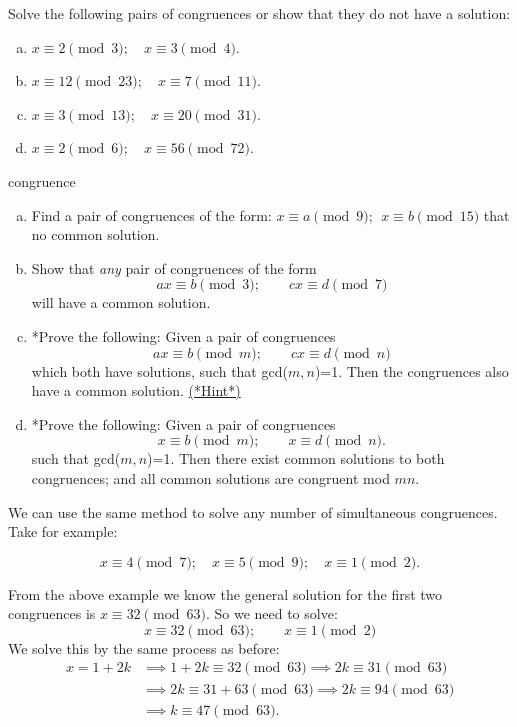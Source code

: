 \begin{exercise}{}
Solve the following pairs of congruences or show that they do not have a solution:
\begin {enumerate}[(a)]
\item
$x \equiv 2 \pmod{3}; \quad x \equiv 3 \pmod{4}.$
\item
$x \equiv 12 \pmod{23}; \quad x \equiv 7 \pmod{11}.$
\item
$x \equiv 3 \pmod{13}; \quad x \equiv 20 \pmod{31}.$
\item
$x \equiv 2 \pmod{6}; \quad  x \equiv 56 \pmod{72}.$
\end {enumerate}
\end {exercise}

\begin {exercise}{congruence}
\begin{enumerate}[(a)]
\item
Find a pair of congruences of the form: $x \equiv a \pmod{9};~~x \equiv b \pmod{15}$ that no common solution.
\item
Show that \emph{any} pair of congruences of the form 
\[ ax \equiv b \pmod{3}; \qquad cx \equiv d \pmod{7} \]
 will have a common solution.
\item
*Prove the following: Given a pair of congruences
\[ ax \equiv b \pmod{m}; \qquad cx \equiv d \pmod{n} \]
 which both have solutions, such that gcd($m,n$)=1. Then the congruences also have a common solution.
 \hyperref[sec:modular_arithmetic:hints]{(*Hint*)}
\item
*Prove the following: Given a pair of congruences
\[ x \equiv b \pmod{m}; \qquad x \equiv d \pmod{n}. \]
 such that gcd($m,n$)=1. Then there exist common solutions to both congruences; and all common solutions are congruent mod $mn$.
\end{enumerate}
\end{exercise}


We can use the same method to solve any number of simultaneous congruences. Take for example:

\[x \equiv 4 \pmod 7; \quad x \equiv 5 \pmod 9; \quad x \equiv 1 \pmod 2.\]

From the above example we know the general solution for the first two congruences  is $x \equiv 32 \pmod {63}$.  So we need to solve:
\[x \equiv 32 \pmod {63}; \qquad x \equiv 1 \pmod 2\]
We solve this by the same process as before: 
\begin{align*}
x = 1 + 2k &\implies 1 + 2k \equiv 32 \pmod {63} \implies 2k \equiv 31 \pmod {63}\\
&\implies 2k \equiv 31+63 \pmod {63} \implies 2k \equiv 94 \pmod {63} \\
&\implies k \equiv 47 \pmod {63}.
\end{align*}

